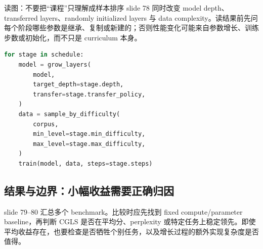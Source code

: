 



\begin{knowledgebox}{读图：不要把“课程”只理解成样本排序}
slide 78 同时改变 model depth、transferred layers、randomly initialized layers 与 data complexity。读结果前先问每个阶段哪些参数是继承、复制或新建的；否则性能变化可能来自参数增长、训练步数或初始化，而不只是 curriculum 本身。
\end{knowledgebox}

\begin{lstlisting}[language=Python,caption={模型深度与数据难度共同调度的伪代码}]
for stage in schedule:
    model = grow_layers(
        model,
        target_depth=stage.depth,
        transfer=stage.transfer_policy,
    )
    data = sample_by_difficulty(
        corpus,
        min_level=stage.min_difficulty,
        max_level=stage.max_difficulty,
    )
    train(model, data, steps=stage.steps)
\end{lstlisting}

\subsection{结果与边界：小幅收益需要正确归因}

slide 79--80 汇总多个 benchmark。比较时应先找到 fixed compute/parameter baseline，再判断 CGLS 是否在平均分、perplexity 或特定任务上稳定领先。即使平均收益存在，也要检查是否牺牲个别任务，以及增长过程的额外实现复杂度是否值得。






